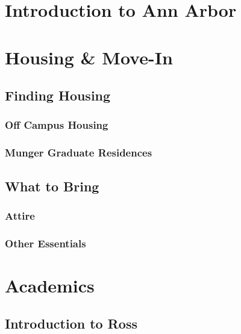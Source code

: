 \documentclass[
]{book}
\begin{document}
\hypertarget{introduction-to-ann-arbor}{%
\chapter{Introduction to Ann Arbor}\label{introduction-to-ann-arbor}}

\hypertarget{move-in}{%
\chapter{Housing \& Move-In}\label{move-in}}

\hypertarget{finding-housing}{%
\section{Finding Housing}\label{finding-housing}}

\hypertarget{off-campus-housing}{%
\subsection{Off Campus Housing}\label{off-campus-housing}}

\hypertarget{munger-graduate-residences}{%
\subsection{Munger Graduate Residences}\label{munger-graduate-residences}}

\hypertarget{what-to-bring}{%
\section{What to Bring}\label{what-to-bring}}

\hypertarget{attire}{%
\subsection{Attire}\label{attire}}

\hypertarget{other-essentials}{%
\subsection{Other Essentials}\label{other-essentials}}

\hypertarget{academics}{%
\chapter{Academics}\label{academics}}

\hypertarget{introduction-to-ross}{%
\section{Introduction to Ross}\label{introduction-to-ross}}
\end{document}
